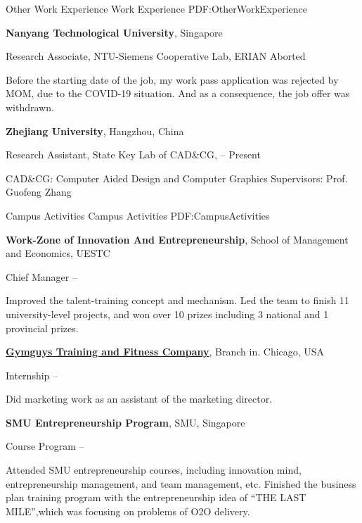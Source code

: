 \documentclass[letterpaper,MMMyyyy,nonstopmode]{simpleresumecv}
\begin{document}
\begin{Body}
\Section
{Other Work\newline
	Experience}
{Work Experience}
{PDF:OtherWorkExperience}


{\textbf{Nanyang Technological University}},
Singapore

\Gap
\BulletItem
Research Associate,
NTU-Siemens Cooperative Lab, ERIAN
\hfill
Aborted
\begin{Detail}
	\SubBulletItem
	Before the starting date of the job, my work pass application was rejected by MOM, due to the COVID-19 situation. And as a consequence, the job offer was withdrawn.
\end{Detail}


\Entry
{\textbf{Zhejiang University}},
Hangzhou, China

\Gap
\BulletItem
Research Assistant,
State Key Lab of CAD\&CG,
\hfill
{} --
Present
\begin{Detail}
	\SubBulletItem
	CAD\&CG: Computer Aided Design and Computer Graphics
	\SubBulletItem
	Supervisors:
	Prof. Guofeng Zhang
\end{Detail}

\Section
{Campus Activities}
{Campus Activities}
{PDF:CampusActivities}

\Entry
{\textbf{Work-Zone of Innovation And Entrepreneurship}},
School of Management and Economics, 
UESTC

\Gap
\BulletItem
Chief Manager
\hfill
{} --
\begin{Detail}
\SubBulletItem
Improved the talent-training concept and mechanism.
\SubBulletItem
Led the team to finish 11 university-level projects, and won over 10 prizes including 3 national
 and 1 provincial prizes.
\end{Detail}

\href{http://www.example.com/my-club}
{\textbf{Gymguys Training and Fitness Company}},
Branch in. 
Chicago, 
USA

\Gap
\BulletItem
Internship
\hfill
{} --
\begin{Detail}
	\SubBulletItem
	Did marketing work as an assistant of the marketing director.
\end{Detail}

{\textbf{SMU Entrepreneurship Program}},
SMU,
Singapore

\Gap
\BulletItem
Course Program
\hfill
{} --
\begin{Detail}
\SubBulletItem
Attended SMU entrepreneurship courses, including innovation mind, entrepreneurship management, and team management, etc.
\SubBulletItem
Finished the business plan training program with the entrepreneurship idea of “THE LAST MILE”,which was focusing on problems of O2O delivery.
\end{Detail}




\end{Body}
\end{document}
